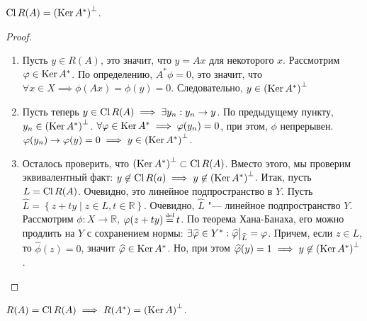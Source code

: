\begin{theorem}
	$\operatorname{Cl} R(A) = \left( \operatorname{Ker} A^*\right)^\bot$.
\end{theorem}
\begin{proof}\ 
	\begin{enumerate}
		\item
            Пусть $y \in R(A)$, это значит, что $y = Ax$ для некоторого $x$.
            Рассмотрим $\varphi \in \operatorname{Ker} A^*$. По определению, $A^*\phi = 0$, это значит,
            что $\forall x \in X \implies \phi(Ax) = \phi(y) = 0$.
            Следовательно, $y \in \left( \operatorname{Ker} A^*\right)^\bot$
		\item
            Пусть теперь $y \in \operatorname{Cl} R(A) \implies \exists y_n : y_n \rightarrow y$.
            По предыдущему пункту, $y_n \in \left( \operatorname{Ker} A^*\right)^\bot$.
            $\forall \varphi \in \operatorname{Ker} A^* \implies \varphi(y_n) = 0$, при этом, $\phi$ непрерывен.
            $\varphi(y_n) \rightarrow \varphi(y) = 0 \implies y \in \left( \operatorname{Ker} A^*\right)^\bot$.
		\item
            Осталось проверить, что $\left( \operatorname{Ker} A^*\right)^\bot \subset \operatorname{Cl} R(A)$.
            Вместо этого, мы проверим эквивалентный факт:
            $y \not\in \operatorname{Cl} R(a) \implies y \not\in \left( \operatorname{Ker} A^*\right)^\bot$.
            Итак, пусть $L = \operatorname{Cl} R(A)$. Очевидно, это линейное подпространство в $Y$.
            Пусть $\widehat{L} = \left\{ z + ty \mid z \in L, t \in \mathbb{R}\right\}$.
            Очевидно, $\widehat{L}$ "--- линейное подпространство $Y$.
            Рассмотрим $\phi : X \rightarrow \mathbb{R}$, $\phi(z + ty) \defeq t$.
            По теорема Хана-Банаха, его можно продлить на $Y$ с сохранением нормы:
            $\exists \widehat{\phi} \in Y^* : \restr{\widehat{\phi}}{\widehat{L}} = \phi$.
            Причем, если $z \in L$, то $\widehat{\phi}(z) = 0$, значит $\widehat{\varphi} \in \operatorname{Ker} A^*$.
            Но, при этом $\widehat{\varphi}(y) = 1 \implies y \not\in \left( \operatorname{Ker} A^*\right)^\bot$. \qedhere
	\end{enumerate}
\end{proof}
\begin{theorem}
	$R(A) = \operatorname{Cl} R(A) \implies R(A^*) = \left( \operatorname{Ker} A\right)^\bot$.
\end{theorem}
